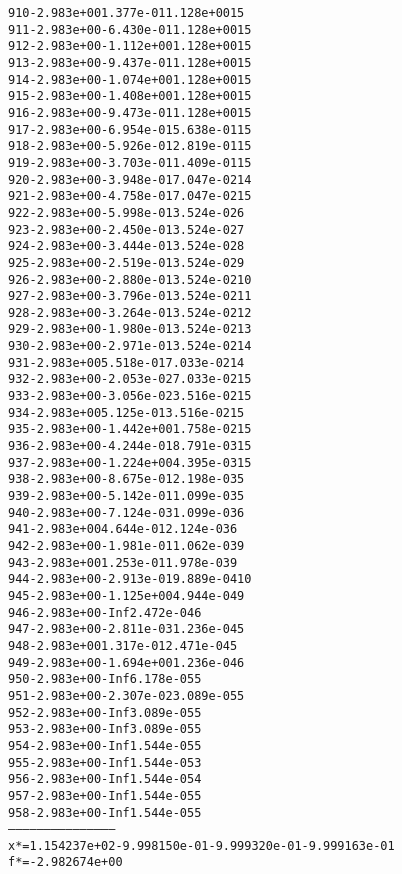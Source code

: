 \begin{alltt}
 910  -2.983e+00   1.377e-01   1.128e+00   15
 911  -2.983e+00  -6.430e-01   1.128e+00   15
 912  -2.983e+00  -1.112e+00   1.128e+00   15
 913  -2.983e+00  -9.437e-01   1.128e+00   15
 914  -2.983e+00  -1.074e+00   1.128e+00   15
 915  -2.983e+00  -1.408e+00   1.128e+00   15
 916  -2.983e+00  -9.473e-01   1.128e+00   15
 917  -2.983e+00  -6.954e-01   5.638e-01   15
 918  -2.983e+00  -5.926e-01   2.819e-01   15
 919  -2.983e+00  -3.703e-01   1.409e-01   15
 920  -2.983e+00  -3.948e-01   7.047e-02   14
 921  -2.983e+00  -4.758e-01   7.047e-02   15
 922  -2.983e+00  -5.998e-01   3.524e-02    6
 923  -2.983e+00  -2.450e-01   3.524e-02    7
 924  -2.983e+00  -3.444e-01   3.524e-02    8
 925  -2.983e+00  -2.519e-01   3.524e-02    9
 926  -2.983e+00  -2.880e-01   3.524e-02   10
 927  -2.983e+00  -3.796e-01   3.524e-02   11
 928  -2.983e+00  -3.264e-01   3.524e-02   12
 929  -2.983e+00  -1.980e-01   3.524e-02   13
 930  -2.983e+00  -2.971e-01   3.524e-02   14
 931  -2.983e+00   5.518e-01   7.033e-02   14
 932  -2.983e+00  -2.053e-02   7.033e-02   15
 933  -2.983e+00  -3.056e-02   3.516e-02   15
 934  -2.983e+00   5.125e-01   3.516e-02   15
 935  -2.983e+00  -1.442e+00   1.758e-02   15
 936  -2.983e+00  -4.244e-01   8.791e-03   15
 937  -2.983e+00  -1.224e+00   4.395e-03   15
 938  -2.983e+00  -8.675e-01   2.198e-03    5
 939  -2.983e+00  -5.142e-01   1.099e-03    5
 940  -2.983e+00  -7.124e-03   1.099e-03    6
 941  -2.983e+00   4.644e-01   2.124e-03    6
 942  -2.983e+00  -1.981e-01   1.062e-03    9
 943  -2.983e+00   1.253e-01   1.978e-03    9
 944  -2.983e+00  -2.913e-01   9.889e-04   10
 945  -2.983e+00  -1.125e+00   4.944e-04    9
 946  -2.983e+00        -Inf   2.472e-04    6
 947  -2.983e+00  -2.811e-03   1.236e-04    5
 948  -2.983e+00   1.317e-01   2.471e-04    5
 949  -2.983e+00  -1.694e+00   1.236e-04    6
 950  -2.983e+00        -Inf   6.178e-05    5
 951  -2.983e+00  -2.307e-02   3.089e-05    5
 952  -2.983e+00        -Inf   3.089e-05    5
 953  -2.983e+00        -Inf   3.089e-05    5
 954  -2.983e+00        -Inf   1.544e-05    5
 955  -2.983e+00        -Inf   1.544e-05    3
 956  -2.983e+00        -Inf   1.544e-05    4
 957  -2.983e+00        -Inf   1.544e-05    5
 958  -2.983e+00        -Inf   1.544e-05    5
---------------------------------------------
x* = 1.154237e+02  -9.998150e-01  -9.999320e-01  -9.999163e-01  
f* = -2.982674e+00
\end{alltt}
